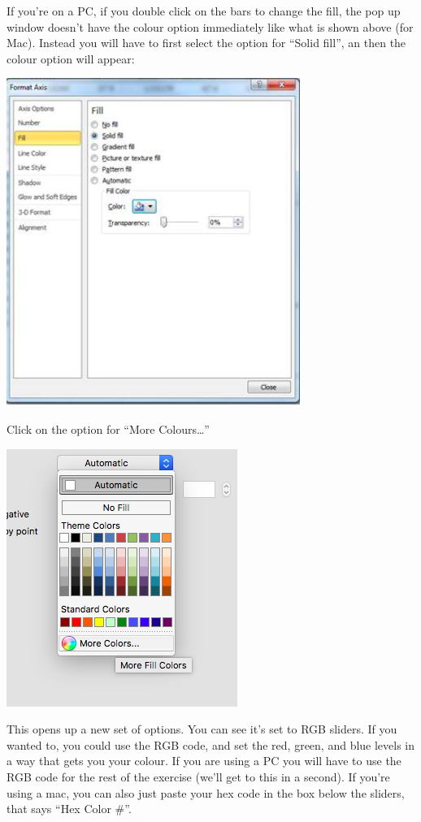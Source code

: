 \documentclass[
]{book}
\begin{document}
If you're on a PC, if you double click on the bars to change the fill, the pop up window doesn't have the colour option immediately like what is shown above (for Mac). Instead you will have to first select the option for ``Solid fill'', an then the colour option will appear:

\includegraphics{imgs/pc_solid_fill.png}

Click on the option for ``More Colours\ldots{}''

\includegraphics{imgs/manual_fill_2.png}

This opens up a new set of options. You can see it's set to RGB sliders. If you wanted to, you could use the RGB code, and set the red, green, and blue levels in a way that gets you your colour. If you are using a PC you will have to use the RGB code for the rest of the exercise (we'll get to this in a second). If you're using a mac, you can also just paste your hex code in the box below the sliders, that says ``Hex Color \#''.
\end{document}
